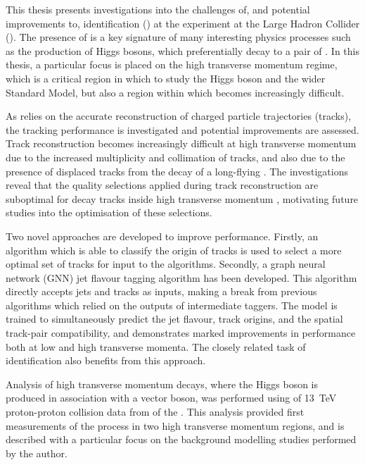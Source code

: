 
This thesis presents investigations into the challenges of, and potential improvements to, \bjet identification (\btagging) at the \ATLAS experiment at the Large Hadron Collider (\LHC).
The presence of \bjets is a key signature of many interesting physics processes such as the production of Higgs bosons, which preferentially decay to a pair of \bquarks.
In this thesis, a particular focus is placed on the high transverse momentum regime, which is a critical region in which to study the Higgs boson and the wider Standard Model, but also a region within which \btagging becomes increasingly difficult.

As \btagging relies on the accurate reconstruction of charged particle trajectories (tracks), the tracking performance is investigated and potential improvements are assessed.
Track reconstruction becomes increasingly difficult at high transverse momentum due to the increased multiplicity and collimation of tracks, and also due to the presence of displaced tracks from the decay of a long-flying \bhadron.
The investigations reveal that the quality selections applied during track reconstruction are suboptimal for \bhadron decay tracks inside high transverse momentum \bjets, motivating future studies into the optimisation of these selections.

Two novel approaches are developed to improve \btagging performance.
Firstly, an algorithm which is able to classify the origin of tracks is used to select a more optimal set of tracks for input to the \btagging algorithms.
Secondly, a graph neural network (GNN) jet flavour tagging algorithm has been developed.
This algorithm directly accepts jets and tracks as inputs, making a break from previous algorithms which relied on the outputs of intermediate taggers.
The model is trained to simultaneously predict the jet flavour, track origins, and the spatial track-pair compatibility, and demonstrates marked improvements in \btagging performance both at low and high transverse momenta.
The closely related task of \cjet identification also benefits from this approach.

Analysis of high transverse momentum \Hbb decays, where the Higgs boson is produced in association with a vector boson, was performed using \intlumi of \SI{13}{\TeV} proton-proton collision data from \runtwo of the \LHC.
This analysis provided first measurements of the \VHbb process in two high transverse momentum regions, and is described with a particular focus on the background modelling studies performed by the author.